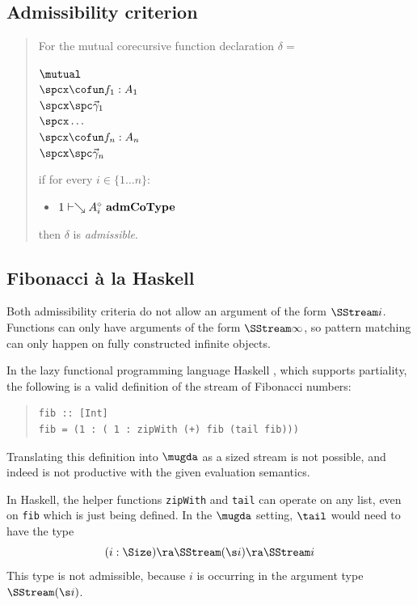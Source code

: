 \subsection{Admissibility criterion}
\begin{quote}
For the mutual corecursive function declaration $\delta =$
\begin{bsp}
$\mutual$\\
$\spcx \cofun f_1 : A_1 $\\
$\spcx \spc \vec{\gamma}_1$\\
$\spcx \ldots$\\
$\spcx \cofun f_n : A_n $\\
$\spcx \spc \vec{\gamma}_n$
\end{bsp}
if  for every $i \in \{1 \ldots n \}$:
\begin{itemize}
\item
$1\vdash\searrow A_i^{\diamond}\mbox{ \textbf{admCoType}}$
\end{itemize}
then $\delta$ is \emph{admissible}.
\end{quote}


\subsection{Fibonacci \`a la Haskell}


Both admissibility criteria do not allow an argument of the form $\SStream i$.
Functions can only have arguments of the form $\SStream \infty$, so pattern matching can only 
happen on fully constructed infinite objects.

In the lazy functional programming language Haskell \cite{haskell}, which supports partiality, the following is a valid definition of the stream of Fibonacci numbers:
\begin{quote}
\begin{verbatim}
fib :: [Int]
fib = (1 : ( 1 : zipWith (+) fib (tail fib)))
\end{verbatim}
\end{quote}
Translating this definition into $\mugda$ as a sized stream is not possible, and indeed is not productive with the given evaluation semantics.

In Haskell, the helper functions \verb+zipWith+ and \verb+tail+ can operate on any list, even on \verb+fib+ which is just being defined.
In the $\mugda$ setting, $\tail$ would need to have the type
\[ ( i : \Size ) \ra \SStream (\s i) \ra \SStream i \]
\noindent This type is not admissible, because $i$ is occurring in the argument type $\SStream (\s i)$.

